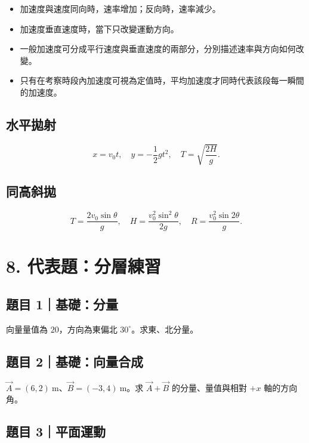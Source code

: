 \documentclass[11pt,a4paper]{article}
\providecommand{\tightlist}{%
  \setlength{\itemsep}{0pt}\setlength{\parskip}{0pt}}
\begin{document}
\begin{itemize}
\tightlist
\item
  加速度與速度同向時，速率增加；反向時，速率減少。
\item
  加速度垂直速度時，當下只改變運動方向。
\item
  一般加速度可分成平行速度與垂直速度的兩部分，分別描述速率與方向如何改變。
\item
  只有在考察時段內加速度可視為定值時，平均加速度才同時代表該段每一瞬間的加速度。
\end{itemize}

\subsection{水平拋射}\label{ux6c34ux5e73ux62cbux5c04}

\[
x=v_0t,
\quad
y=-\frac12gt^2,
\quad
T=\sqrt{\frac{2H}{g}}.
\]

\subsection{同高斜拋}\label{ux540cux9ad8ux659cux62cb}

\[
T=\frac{2v_0\sin\theta}{g},
\quad
H=\frac{v_0^2\sin^2\theta}{2g},
\quad
R=\frac{v_0^2\sin2\theta}{g}.
\]

\section{8. 代表題：分層練習}\label{ux4ee3ux8868ux984cux5206ux5c64ux7df4ux7fd2}

\subsection{題目 1｜基礎：分量}\label{ux984cux76ee-1ux57faux790eux5206ux91cf}

向量量值為 \(20\)，方向為東偏北 \(30^\circ\)。求東、北分量。

\subsection{題目 2｜基礎：向量合成}\label{ux984cux76ee-2ux57faux790eux5411ux91cfux5408ux6210}

\(\vec A=(6,2)\ \mathrm{m}\)、\(\vec B=(-3,4)\ \mathrm{m}\)。求 \(\vec A+\vec B\) 的分量、量值與相對 \(+x\) 軸的方向角。

\subsection{題目 3｜平面運動}\label{ux984cux76ee-3ux5e73ux9762ux904bux52d5}
\end{document}
